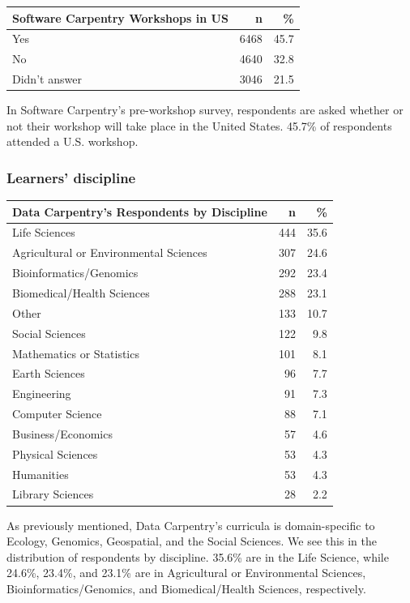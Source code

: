 \documentclass[]{article}
\begin{document}
\begin{longtable}[]{@{}lrr@{}}
\toprule
Software Carpentry Workshops in US & n & \%\tabularnewline
\midrule
\endhead
Yes & 6468 & 45.7\tabularnewline
No & 4640 & 32.8\tabularnewline
Didn't answer & 3046 & 21.5\tabularnewline
\bottomrule
\end{longtable}

In Software Carpentry's pre-workshop survey, respondents are asked
whether or not their workshop will take place in the United States.
45.7\% of respondents attended a U.S. workshop.

\subsubsection{Learners' discipline}\label{learners-discipline}

\begin{longtable}[]{@{}lrr@{}}
\toprule
Data Carpentry's Respondents by Discipline & n & \%\tabularnewline
\midrule
\endhead
Life Sciences & 444 & 35.6\tabularnewline
Agricultural or Environmental Sciences & 307 & 24.6\tabularnewline
Bioinformatics/Genomics & 292 & 23.4\tabularnewline
Biomedical/Health Sciences & 288 & 23.1\tabularnewline
Other & 133 & 10.7\tabularnewline
Social Sciences & 122 & 9.8\tabularnewline
Mathematics or Statistics & 101 & 8.1\tabularnewline
Earth Sciences & 96 & 7.7\tabularnewline
Engineering & 91 & 7.3\tabularnewline
Computer Science & 88 & 7.1\tabularnewline
Business/Economics & 57 & 4.6\tabularnewline
Physical Sciences & 53 & 4.3\tabularnewline
Humanities & 53 & 4.3\tabularnewline
Library Sciences & 28 & 2.2\tabularnewline
\bottomrule
\end{longtable}

As previously mentioned, Data Carpentry's curricula is domain-specific
to Ecology, Genomics, Geospatial, and the Social Sciences. We see this
in the distribution of respondents by discipline. 35.6\% are in the Life
Science, while 24.6\%, 23.4\%, and 23.1\% are in Agricultural or
Environmental Sciences, Bioinformatics/Genomics, and Biomedical/Health
Sciences, respectively.
\end{document}

